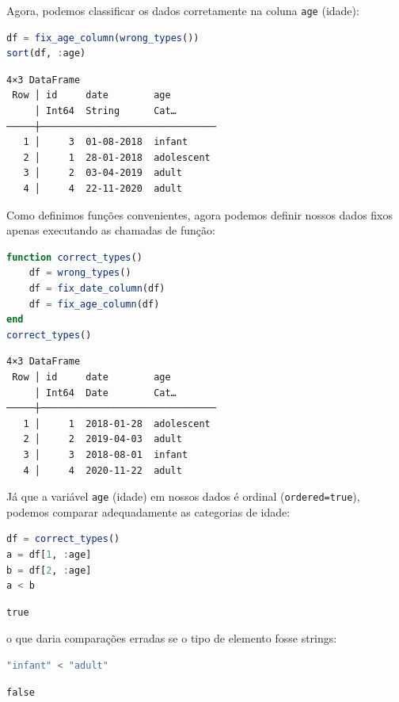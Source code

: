 \documentclass[
  notoc %
]{tufte-book}
\newcommand{\passthrough}[1]{#1}
\begin{document}
Agora, podemos classificar os dados corretamente na coluna
\passthrough{\lstinline!age!} (idade):

\begin{lstlisting}[language=Julia]
df = fix_age_column(wrong_types())
sort(df, :age)
\end{lstlisting}

\begin{lstlisting}[language=Output]
4×3 DataFrame
 Row │ id     date        age
     │ Int64  String      Cat…
─────┼───────────────────────────────
   1 │     3  01-08-2018  infant
   2 │     1  28-01-2018  adolescent
   3 │     2  03-04-2019  adult
   4 │     4  22-11-2020  adult
\end{lstlisting}

Como definimos funções convenientes, agora podemos definir nossos dados
fixos apenas executando as chamadas de função:

\begin{lstlisting}[language=Julia]
function correct_types()
    df = wrong_types()
    df = fix_date_column(df)
    df = fix_age_column(df)
end
correct_types()
\end{lstlisting}

\begin{lstlisting}[language=Output]
4×3 DataFrame
 Row │ id     date        age
     │ Int64  Date        Cat…
─────┼───────────────────────────────
   1 │     1  2018-01-28  adolescent
   2 │     2  2019-04-03  adult
   3 │     3  2018-08-01  infant
   4 │     4  2020-11-22  adult
\end{lstlisting}

Já que a variável \passthrough{\lstinline!age!} (idade) em nossos dados
é ordinal (\passthrough{\lstinline!ordered=true!}), podemos comparar
adequadamente as categorias de idade:

\begin{lstlisting}[language=Julia]
df = correct_types()
a = df[1, :age]
b = df[2, :age]
a < b
\end{lstlisting}

\begin{lstlisting}[language=Output]
true
\end{lstlisting}

o que daria comparações erradas se o tipo de elemento fosse strings:

\begin{lstlisting}[language=Julia]
"infant" < "adult"
\end{lstlisting}

\begin{lstlisting}[language=Output]
false
\end{lstlisting}
\end{document}

